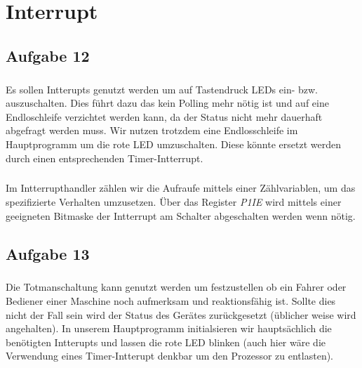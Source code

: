 \chapter{Interrupt}

\section{Aufgabe 12}

\paragraph*{}
Es sollen Intterupts genutzt werden um auf Tastendruck LEDs ein- bzw. auszuschalten. Dies führt dazu das kein Polling mehr nötig ist und auf eine Endloschleife verzichtet werden kann, da der Status nicht mehr dauerhaft abgefragt werden muss. Wir nutzen trotzdem eine Endlosschleife im Hauptprogramm um die rote LED umzuschalten. Diese könnte ersetzt werden durch einen entsprechenden Timer-Intterrupt. \\



\paragraph*{}
Im Intterrupthandler zählen wir die Aufraufe mittels einer Zählvariablen, um das spezifizierte Verhalten umzusetzen. Über das Register {\em P1IE} wird mittels einer geeigneten Bitmaske der Intterrupt am Schalter abgeschalten werden wenn nötig. \\ 



\section{Aufgabe 13}

\paragraph*{}
Die Totmanschaltung kann genutzt werden um festzustellen ob ein Fahrer oder Bediener einer Maschine noch aufmerksam und reaktionsfähig ist. Sollte dies nicht der Fall sein wird der Status des Gerätes zurückgesetzt (üblicher weise wird angehalten). In unserem Hauptprogramm initialsieren wir hauptsächlich die benötigten Intterupts und lassen die rote LED blinken (auch hier wäre die Verwendung eines Timer-Intterupt denkbar um den Prozessor zu entlasten). \\ 

